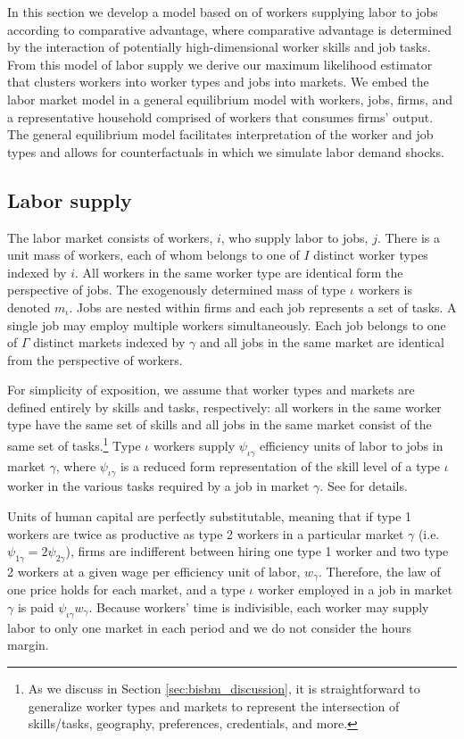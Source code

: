 \documentclass[12pt]{article}
\def\ig{\iota\gamma}
\def\g{\gamma}
\def\i{\iota}
\theoremstyle{definition}
\theoremstyle{plain}
\begin{document}
In this section we develop a model based on \citet{Grigsby2019} of workers supplying labor to jobs according to comparative advantage, where comparative advantage is determined by the interaction of potentially high-dimensional worker skills and job tasks. From this model of labor supply we derive our maximum likelihood estimator that clusters workers into worker types and jobs into markets. We embed the labor market model in a general equilibrium model with workers, jobs, firms, and a representative household comprised of workers that consumes firms' output. The general equilibrium model facilitates interpretation of the worker and job types and allows for counterfactuals in which we simulate labor demand shocks.


\subsection{Labor supply}

The labor market consists of workers, $i$, who supply labor to jobs, $j$. There is a unit mass of workers, each of whom belongs to one of $I$ distinct worker types indexed by $i$. All workers in the same worker type are identical form the perspective of jobs. The exogenously determined mass of type $\i$ workers is denoted $m_{\i}$. Jobs are nested within firms and each job represents a set of tasks. A single job may employ multiple workers simultaneously. Each job belongs to one of $\Gamma$ distinct markets indexed by $\g$ and all jobs in the same market are identical from the perspective of workers.

For simplicity of exposition, we assume that worker types and markets are defined entirely by skills and tasks, respectively: all workers in the same worker type have the same set of skills and all jobs in the same market consist of the same set of tasks.\footnote{As we discuss in Section \ref{sec:bisbm_discussion}, it is straightforward to generalize worker types and markets to represent the intersection of skills/tasks, geography, preferences, credentials, and more.} Type $\i$ workers supply $\psi_{\ig}$ efficiency units of labor to jobs in market $\g$, where $\psi_{\ig}$ is a reduced form representation of the skill level of a type $\i$ worker in the various tasks required by a job in market $\g$. See \citet{Grigsby2019} for details.

Units of human capital are perfectly substitutable, meaning that if type 1 workers are twice as productive as type 2 workers in a particular market $\g$ (i.e. $\psi_{1\g} = 2\psi_{2\g}$), firms are indifferent between hiring one type 1 worker and two type 2 workers at a given wage per efficiency unit of labor, $w_{\g}$. Therefore, the law of one price holds for each market, and a type $\i$ worker employed in a job in market $\g$ is paid $\psi_{\ig}w_{\g}$. Because workers' time is indivisible, each worker may supply labor to only one market in each period and we do not consider the hours margin.
\end{document}
